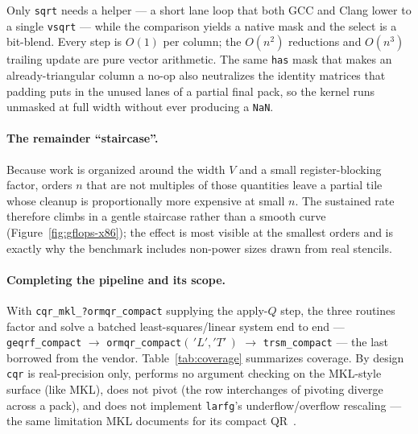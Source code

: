 \documentclass[11pt]{article}
\newcommand{\code}[1]{\texttt{#1}}
\newcommand{\cqr}{\mbox{\texttt{cqr}}}
\begin{document}
\noindent
Only \code{sqrt} needs a helper --- a short lane loop that both GCC and Clang
lower to a single \code{vsqrt} --- while the comparison yields a native mask and
the select is a bit-blend. Every step is $O(1)$ per column; the $O(n^2)$
reductions and $O(n^3)$ trailing update are pure vector arithmetic. The same
\code{has} mask that makes an already-triangular column a no-op also neutralizes
the identity matrices that padding puts in the unused lanes of a partial final
pack, so the kernel runs unmasked at full width without ever producing a
\code{NaN}.

\paragraph{The remainder ``staircase''.}
Because work is organized around the width $V$ and a small register-blocking
factor, orders $n$ that are not multiples of those quantities leave a partial
tile whose cleanup is proportionally more expensive at small $n$. The sustained
rate therefore climbs in a gentle staircase rather than a smooth curve
(Figure~\ref{fig:gflops-x86}); the effect is most visible at the smallest orders and
is exactly why the benchmark includes non-power sizes drawn from real stencils.

\paragraph{Completing the pipeline and its scope.}
With \code{cqr\_mkl\_?ormqr\_compact} supplying the apply-$Q$ step, the three
routines factor and solve a batched least-squares/linear system end to end ---
\code{geqrf\_compact} $\to$ \code{ormqr\_compact}$(\,'L','T'\,)$ $\to$
\code{trsm\_compact} --- the last borrowed from the vendor. Table~\ref{tab:coverage}
summarizes coverage. By design \cqr{} is real-precision only, performs no
argument checking on the MKL-style surface (like MKL), does not pivot (the row
interchanges of pivoting diverge across a pack), and does not implement
\code{larfg}'s underflow/overflow rescaling --- the same limitation MKL documents
for its compact QR~\cite{mkl-compact-limits}.
\end{document}
